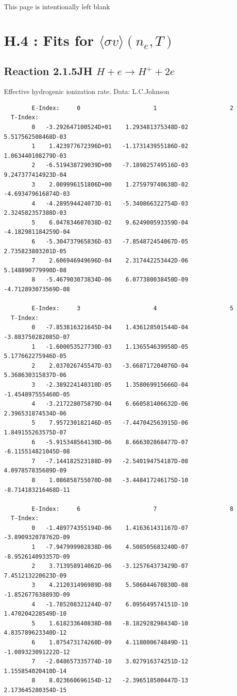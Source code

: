 \documentclass[12pt,dvips]{article}
\begin{document}
\newpage
This page is intentionally left blank
\newpage


\section{H.4 :  Fits for $\langle\sigma v \rangle (n_e,T)$}\label{sect4}

\subsection{
Reaction 2.1.5JH   $H + e \rightarrow H^+ + 2e $}

   Effective hydrogenic ionization rate. Data: L.C.Johnson

\begin{small}\begin{verbatim}
        E-Index:     0                     1                     2
  T-Index:
        0   -3.292647100524D+01    1.293481375348D-02    5.517562508468D-03
        1    1.423977672396D+01   -1.173143955186D-02    1.063440108279D-03
        2   -6.519438729039D+00   -7.189825749516D-03    9.247377414923D-04
        3    2.009996151806D+00    1.275979740638D-02   -4.693479616874D-03
        4   -4.289594424073D-01   -5.340866322754D-03    2.324582357388D-03
        5    6.047834607038D-02    9.624900593359D-04   -4.182981184259D-04
        6   -5.304737965836D-03   -7.854872454067D-05    2.735823803201D-05
        7    2.606946949696D-04    2.317442253442D-06    5.148890779990D-08
        8   -5.467903073834D-06    6.077380038450D-09   -4.712893073569D-08

        E-Index:     3                     4                     5
  T-Index:
        0   -7.853816321645D-04    1.436128501544D-04   -3.883750282085D-07
        1   -1.600053527730D-03    1.136554639958D-05    5.177662275946D-05
        2    2.037026745547D-03   -3.668717204076D-04    5.368630315837D-06
        3   -2.389224140310D-05    1.358069915666D-04   -1.454897555460D-05
        4   -3.217228075879D-04    6.660581406632D-06    2.396531874534D-06
        5    7.957230182146D-05   -7.447042563915D-06    1.849155263575D-07
        6   -5.915348564130D-06    8.666302868477D-07   -6.115514821045D-08
        7   -7.144182523188D-09   -2.540194754187D-08    4.097857835689D-09
        8    1.086858755070D-08   -3.448417246175D-10   -8.714183216468D-11

        E-Index:     6                     7                     8
  T-Index:
        0   -1.489774355194D-06    1.416361431167D-07   -3.890932078762D-09
        1   -7.947999902838D-06    4.508505683240D-07   -8.952614093357D-09
        2    3.713958914062D-06   -3.125764373429D-07    7.451213220623D-09
        3    4.212031496989D-08    5.506044670830D-08   -1.852677638893D-09
        4   -1.785208321244D-07    6.095649574151D-10    1.470204228549D-10
        5    1.618233640838D-08   -8.182928298434D-10    4.835789623340D-12
        6    1.075473174260D-09    4.118000674849D-11   -1.089323091222D-12
        7   -2.048657335774D-10    3.027916374251D-12    1.155854020410D-14
        8    8.023660696154D-12   -2.396518500447D-13    2.173645280354D-15


\end{verbatim}
\end{small}
\end{document}
